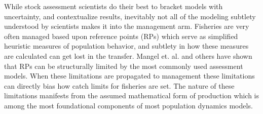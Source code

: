 \documentclass[12pt]{ucscthesis}
\begin{document}

%
While stock assessment scientists do their best to bracket models with 
uncertainty, and contextualize results, inevitably not all of the modeling 
subtlety understood by scientists makes it into the management arm. Fisheries 
are very often managed based upon reference points (RPs) which serve as 
simplified heuristic measures of population behavior, and subtlety in how 
these measures are calculated can get lost in the transfer. %
Mangel et. al. \cite{mangel_perspective_2013} and others have shown that RPs can 
be structurally limited by the most commonly used assessment models. When 
these limitations are propagated to management these limitations can directly 
bias how catch limits for fisheries are set. The nature of these limitations 
manifests from the assumed mathematical form of production which is among the 
most foundational components of most population dynamics models. 
\end{document}
